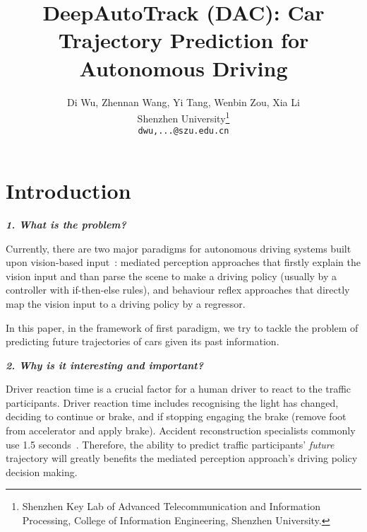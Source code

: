 \documentclass[10pt,twocolumn,letterpaper]{article}
\begin{document}
\title{DeepAutoTrack (DAC): Car Trajectory Prediction for Autonomous Driving}

\author{Di Wu, Zhennan Wang, Yi Tang,  Wenbin Zou, Xia Li\\
Shenzhen University\thanks{Shenzhen Key Lab of Advanced Telecommunication and Information Processing, College of Information Engineering, Shenzhen University.}\\
{\tt\small dwu,...@szu.edu.cn}}
\maketitle
\begin{abstract}


\end{abstract}
\section{Introduction}

\textbf{\emph{1. What is the problem?}}

Currently, there are two major paradigms for autonomous driving systems built upon vision-based input~\cite{chen2015deepdriving}: mediated perception approaches that firstly explain the vision input and than parse the scene to make a driving policy (usually by a controller with if-then-else rules), and behaviour reflex approaches that directly map the vision input to a driving policy by a regressor.

In this paper, in the framework of first paradigm, we try to tackle the problem of predicting future trajectories of cars given its past information.

\textbf{\emph{2. Why is it interesting and important?}}

Driver reaction time is a crucial factor for a human driver to react to the traffic participants. Driver reaction time includes recognising the light has changed, deciding to continue or brake, and if stopping engaging the brake (remove foot from accelerator and apply brake). Accident reconstruction specialists commonly use 1.5 seconds~\cite{mcgehee2000driver}.
Therefore, the ability to predict traffic participants' \emph{future} trajectory will greatly benefits the mediated perception approach's driving policy decision making.
\end{document}
